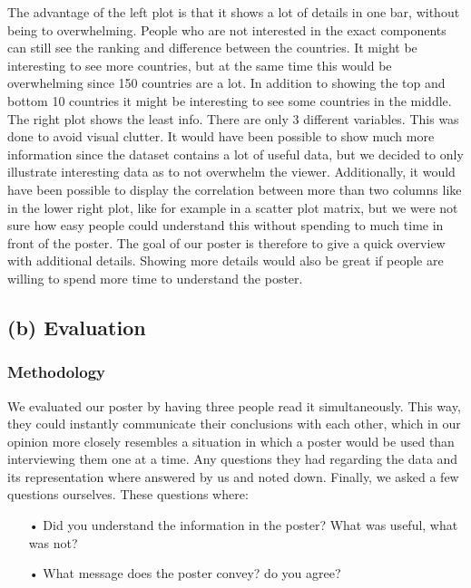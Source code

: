 \documentclass[a4paper]{article}
\begin{document}
The advantage of the left plot is that it shows a lot of details in one bar, without being to overwhelming. 
People who are not interested in the exact components can still see the ranking and difference between the countries. 
It might be interesting to see more countries, but at the same time this would be overwhelming since 150 countries are a lot. 
In addition to showing the top and bottom 10 countries it might be interesting to see some countries in the middle. 
The right plot shows the least info. 
There are only 3 different variables. This was done to avoid visual clutter. 
It would have been possible to show much more information since the dataset contains a lot of useful data, but we decided to only illustrate interesting data as to not overwhelm the viewer. 
Additionally, it would have been possible to display the correlation between more than two columns like in the lower right plot, like for example in a scatter plot matrix, but we were not sure how easy people could understand this without spending to much time in front of the poster. 
The goal of our poster is therefore to give a quick overview with additional details. Showing more details would also be great if people are willing to spend more time to understand the poster. 


\subsection*{(b) Evaluation}
\subsubsection*{Methodology}
We evaluated our poster by having three people read it simultaneously. 
This way, they could instantly communicate their conclusions with each other, which in our opinion more closely resembles a situation in which a poster would be used than interviewing them one at a time.
Any questions they had regarding the data and its representation where answered by us and noted down.
Finally, we asked a few questions ourselves. These questions where:
\begin{enumerate}
\item[•]Did you understand the information in the poster? What was useful, what was not?
\item[•]What message does the poster convey? do you agree?
\end{enumerate}
\end{document}
